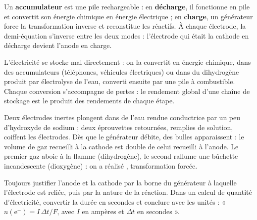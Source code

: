 \begin{definition}[Accumulateur]
Un \textbf{accumulateur} est une pile rechargeable : en \textbf{décharge}, il fonctionne en pile et convertit son
énergie chimique en énergie électrique ; en \textbf{charge}, un générateur force la transformation inverse et
reconstitue les réactifs. À chaque électrode, la demi-équation s'inverse entre les deux modes : l'électrode qui était la
cathode en décharge devient l'anode en charge.
\end{definition}
\begin{propriete}
L'électricité se stocke mal directement : on la convertit en énergie chimique, dans des accumulateurs (téléphones,
véhicules électriques) ou dans du dihydrogène produit par électrolyse de l'eau, converti ensuite par une pile à
combustible. Chaque conversion s'accompagne de pertes : le rendement global d'une chaîne de stockage est le produit des
rendements de chaque étape.
\end{propriete}
\begin{experience}
Deux électrodes inertes plongent dans de l'eau rendue conductrice par un peu d'hydroxyde de sodium ; deux éprouvettes
retournées, remplies de solution, coiffent les électrodes. Dès que le générateur débite, des bulles apparaissent : le
volume de gaz recueilli à la cathode est double de celui recueilli à l'anode. Le premier gaz aboie à la flamme
(dihydrogène), le second rallume une bûchette incandescente (dioxygène) : on a réalisé
, transformation forcée.
\end{experience}
\begin{rediger}
Toujours justifier l'anode et la cathode par la borne du générateur à laquelle l'électrode est reliée, puis par la
nature de la réaction. Dans un calcul de quantité d'électricité, convertir la durée en secondes et conclure avec les
unités : « $n(\mathrm{e}^-)=I\,\Delta t/F$, avec $I$ en ampères et $\Delta t$ en secondes ».
\end{rediger}
\exercices


